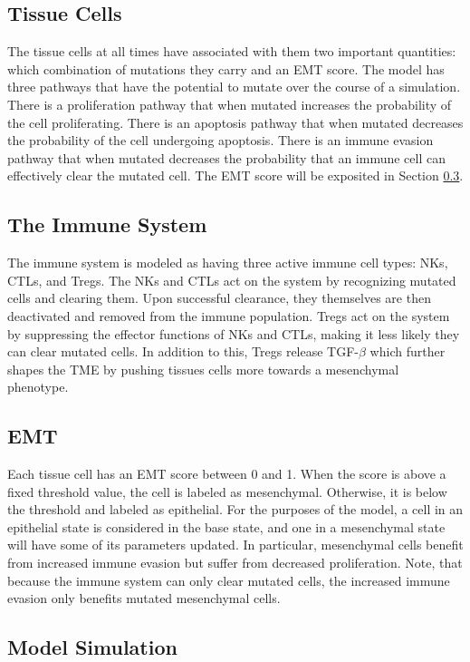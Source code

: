 \documentclass[11pt]{article}
\begin{document}
\subsection{Tissue Cells}\label{TissueCells}
The tissue cells at all times have associated with them two important quantities: which combination of mutations they carry and an EMT score.
The model has three pathways that have the potential to mutate over the course of a simulation.
There is a proliferation pathway that when mutated increases the probability of the cell proliferating.
There is an apoptosis pathway that when mutated decreases the probability of the cell undergoing apoptosis.
There is an immune evasion pathway that when mutated decreases the probability that an immune cell can effectively clear the mutated cell.
The EMT score will be exposited in Section \ref{EMT}. 

\subsection{The Immune System}\label{ImmuneSystem}
The immune system is modeled as having three active immune cell types: NKs, CTLs, and Tregs.
The NKs and CTLs act on the system by recognizing mutated cells and clearing them.
Upon successful clearance, they themselves are then deactivated and removed from the immune population.
Tregs act on the system by suppressing the effector functions of NKs and CTLs, making it less likely they can clear mutated cells.
In addition to this, Tregs release TGF-$\beta$ which further shapes the TME by pushing tissues cells more towards a mesenchymal phenotype.

\subsection{EMT}\label{EMT}
Each tissue cell has an EMT score between 0 and 1.
When the score is above a fixed threshold value, the cell is labeled as mesenchymal.
Otherwise, it is below the threshold and labeled as epithelial.
For the purposes of the model, a cell in an epithelial state is considered in the base state, and one in a mesenchymal state will have some of its parameters updated.
In particular, mesenchymal cells benefit from increased immune evasion but suffer from decreased proliferation.
Note, that because the immune system can only clear mutated cells, the increased immune evasion only benefits mutated mesenchymal cells.

\subsection{Model Simulation}
\end{document}
